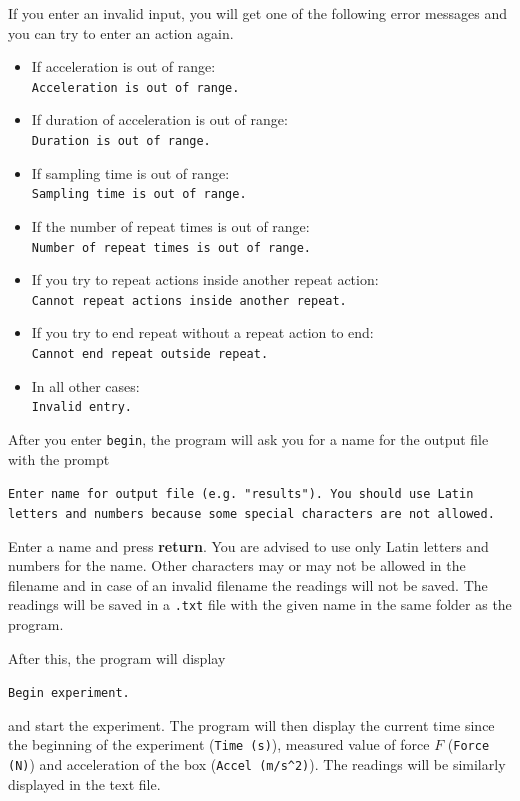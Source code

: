 If you enter an invalid input, you will get one of the following error messages
and you can try to enter an action again.
\begin{itemize}
\item If acceleration is out of range:\\
\texttt{Acceleration is out of range.}
\item If duration of acceleration is out of range:\\
\texttt{Duration is out of range.}
\item If sampling time is out of range:\\
\texttt{Sampling time is out of range.}
\item If the number of repeat times is out of range:\\
\texttt{Number of repeat times is out of range.}
\item If you try to repeat actions inside another repeat action:\\
\texttt{Cannot repeat actions inside another repeat.}
\item If you try to end repeat without a repeat action to end:\\
\texttt{Cannot end repeat outside repeat.}
\item In all other cases:\\
\texttt{Invalid entry.}
\end{itemize}

After you enter \texttt{begin}, the program will ask you for a name for the
output file with the prompt

\texttt{Enter name for output file (e.g. "results"). You should use Latin
letters and numbers because some special characters are not allowed.}

Enter a name and press \textbf{return}. You are advised to use only Latin
letters and numbers for the name. Other characters may or may not be allowed in
the filename and in case of an invalid filename the readings will not be saved.
The readings will be saved in a \texttt{.txt} file with the given name in the
same folder as the program.

After this, the program will display

\texttt{Begin experiment.}

and start the experiment. The program will then display the current time since
the beginning of the experiment (\texttt{Time (s)}), measured value of force
$F$ (\texttt{Force (N)}) and acceleration of the box
(\texttt{Accel (m/s\textasciicircum 2)}). The readings will be similarly
displayed in the text file.


